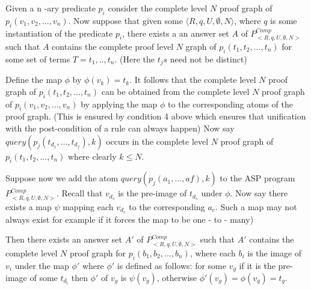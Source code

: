 Given a n -ary predicate $p_{i}$ consider the complete level $N$ proof graph of $p_{i}(v_{1},v_{2},...,v_{n})$. Now suppose that given some $\langle R,q,U,\emptyset,N\rangle$, where $q$ is some instantiation of the predicate $p_{i}$, there exists a an answer set $A$ of $P_{<R,q,U,\emptyset,N>}^{Comp}$ such that $A$ contains the complete proof level $N$ graph of $p_{i}(t_{1},t_{2},...,t_{n})$ for some set of terms  $T = t_{1},..,t_{n}$. (Here the $t_{j}s$ need not be distinct)

Define the map $\phi$ by $\phi(v_{k})= t_{k}$. It follows that the complete level $N$ proof graph  of $p_{i}(t_{1},t_{2},...,t_{n})$ can be obtained from the complete level $N$ proof graph of $p_{i}(v_{1},v_{2},...,v_{n})$ by applying the map $\phi$ to the corresponding atoms of the proof graph. (This is ensured by condition 4 above which ensures that unification with the post-condition of a rule can always happen) Now say $query(p_{j}(t_{d_{1}},...,t_{d_{f}}),k)$ occurs in the complete level $N$ proof graph of $p_{i}(t_{1},t_{2},...,t_{n})$ where clearly $k\leq N$.

Suppose now we add the atom $query(p_{j}(a_{1},...,a{f}),k)$ to the ASP program $P_{<R,q,U,\emptyset,N>}^{Comp}$. Recall that $v_{d_{s}}$ is the pre-image of $t_{d_{s}}$ under $\phi$. Now say there exists a map $\psi$ mapping each $v_{d_{c}}$ to the corresponding $a_{c}$. Such a map may not always exist for example if it forces the map to be one - to - many)

Then there exists an answer set $A'$ of $P_{<R,q,U,\emptyset,N>}^{Comp}$ such that $A'$ contains the complete level $N$ proof graph for $p_{i}(b_{1},b_{2},...,b_{n})$, where each $b_{i}$ is the image of $v_{i}$ under the map $\phi'$ where $\phi'$ is defined as follows: for some $v_{g}$ if it is the pre-image of some $t_{d_{l}}$ then $\phi'$ of $v_{g}$ is $\psi(v_{g})$, otherwise $\phi'(v_{g}) = \phi(v_{g})= t_{g}$.

